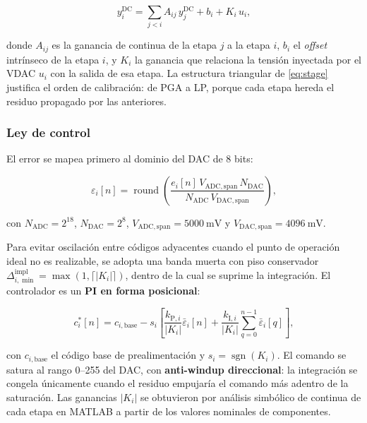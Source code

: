 \begin{equation}
y_i^{\mathrm{DC}}=\sum_{j<i}A_{ij}\,y_j^{\mathrm{DC}}+b_i+K_i\,u_i,
\label{eq:stage}
\end{equation}

donde $A_{ij}$ es la ganancia de continua de la etapa $j$ a la etapa $i$, $b_i$ el
\emph{offset} intr\'inseco de la etapa $i$, y $K_i$ la ganancia que relaciona la tensi\'on
inyectada por el VDAC $u_i$ con la salida de esa etapa. La estructura triangular de
\eqref{eq:stage} justifica el orden de calibraci\'on: de PGA a LP, porque cada etapa
hereda el residuo propagado por las anteriores.

\subsubsection{Ley de control}

El error se mapea primero al dominio del DAC de 8 bits:

\begin{equation}
\varepsilon_i[n]=\operatorname{round}\!\left(
\frac{e_i[n]\,V_{\mathrm{ADC,span}}\,N_{\mathrm{DAC}}}
{N_{\mathrm{ADC}}\,V_{\mathrm{DAC,span}}}\right),
\label{eq:scale}
\end{equation}

con $N_{\mathrm{ADC}}=2^{18}$, $N_{\mathrm{DAC}}=2^{8}$,
$V_{\mathrm{ADC,span}}=\SI{5000}{\milli\volt}$ y
$V_{\mathrm{DAC,span}}=\SI{4096}{\milli\volt}$.

Para evitar oscilaci\'on entre c\'odigos adyacentes cuando el punto de operaci\'on ideal no
es realizable, se adopta una banda muerta con piso conservador
$\Delta_{i,\min}^{\mathrm{impl}}=\max(1,\lceil|K_i|\rceil)$, dentro de la cual se
suprime la integraci\'on. El controlador es un \textbf{PI en forma posicional}:

\begin{equation}
c_i^{*}[n]=c_{i,\mathrm{base}}-s_i\left[
\frac{k_{\mathrm{P},i}}{|K_i|}\bar{\varepsilon}_i[n]
+\frac{k_{\mathrm{I},i}}{|K_i|}\sum_{q=0}^{n-1}\bar{\varepsilon}_i[q]\right],
\label{eq:pi}
\end{equation}

con $c_{i,\mathrm{base}}$ el c\'odigo base de prealimentaci\'on y
$s_i=\operatorname{sgn}(K_i)$. El comando se satura al rango 0--255 del DAC, con
\textbf{anti-windup direccional}: la integraci\'on se congela \'unicamente cuando el
residuo empujar\'ia el comando m\'as adentro de la saturaci\'on. Las ganancias $|K_i|$ se
obtuvieron por an\'alisis simb\'olico de continua de cada etapa en MATLAB a partir de los
valores nominales de componentes.

